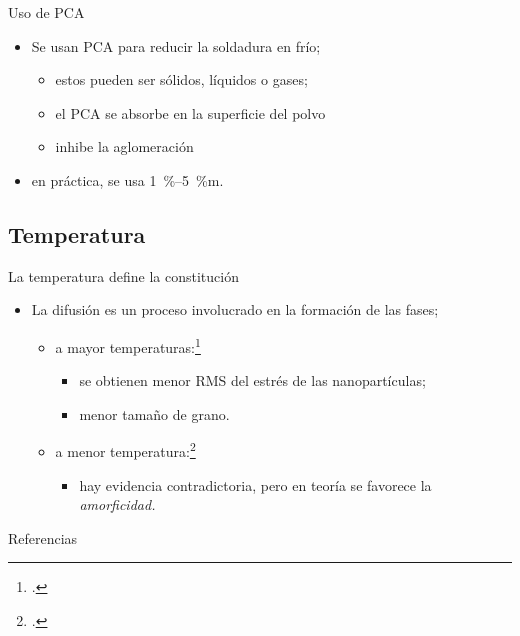 \documentclass[%
spanish,
progressbar=head,
subsectionpage,
aspectratio=169
]{beamer}
\begin{document}
\begin{frame}{Uso de PCA}
\begin{itemize}
    \item Se usan \gls{PCA} para reducir la soldadura en frío;
    \begin{itemize}
        \item estos pueden ser sólidos, líquidos o gases;
        \item el \gls{PCA} se absorbe en la superficie del polvo
        \item inhibe la aglomeración
    \end{itemize} 
    \item en práctica, se usa \qtyrange{1}{5}{\percent}m.
\end{itemize}
\end{frame}

\subsection{Temperatura}

\begin{frame}{La temperatura define la constitución}
    \begin{itemize}
        \item<1-> La difusión es un proceso involucrado en la formación de las fases;
        \begin{itemize}
            \item<2-> a mayor temperaturas:\footcite{hongSteadyStateGrain1994}
            \begin{itemize}
                \item<3-> se obtienen menor RMS del estrés de las nanopartículas;
                \item<4-> menor tamaño de grano.
            \end{itemize} 
            \item<5-> a menor temperatura:\footcite{kimuraProcessingControlSolid1989}
            \begin{itemize}
                \item<6-> hay evidencia contradictoria, pero en teoría se favorece la \emph{amorficidad.}
            \end{itemize}
        \end{itemize}
    \end{itemize}
\end{frame}

\begin{frame}[allowframebreaks]{Referencias}
    \small
    \printbibliography
\end{frame}
\end{document}
